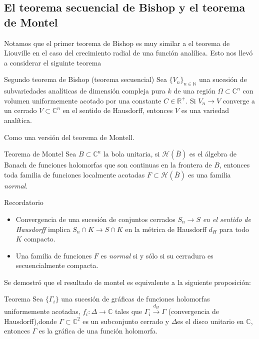 \documentclass[letterpaper]{beamer}
\newcommand{\nat}{\ensuremath{ \mathbb N }}
\newcommand{\co}{\ensuremath{\mathbb C }}
\newcommand{\con}{\ensuremath{\mathbb{C}^n}}
\newcommand{\re}{\ensuremath{\mathbb R }}
\begin{document}
\subsection{El teorema secuencial de Bishop y el teorema de Montel}

\begin{frame}
      Notamos que el primer teorema de Bishop es muy similar a el teorema de Liouville en el caso del crecimiento radial de una función analílica. Esto nos llevó a considerar el siguinte teorema
      \begin{block}{Segundo teorema de Bishop (teorema secuencial)}\label{Bishop2}
        Sea $\{ V_n \}_{n\in\nat}$ una sucesi\'on de subvariedades anal\'iticas de dimensi\'on compleja pura $k$ de una regi\'on
        $\Omega\subset\con$ con volumen uniformemente acotado por una constante $C\in\re^{+}$.
        Si $V_n\rightarrow V$ converge a un cerrado $V\subset\con$ en el sentido de Hausdorff, entonces $V$ es una
        variedad anal\'itica.
      \end{block}
      Como una versión del teorema de Montell.
\end{frame}

\begin{frame}
\begin{block}{Teorema de Montel}\label{Montel}
        Sea $B\subset\con$ la bola unitaria, si $\mathcal{H}(\overline{B})$ es el \'algebra de Banach de funciones holomorfas que son continuas
        en la frontera de $B$, entonces toda familia de funciones localmente acotadas $F\subset\mathcal{H}(\overline{B})$ es una familia \textit{normal}.
      \end{block}
      \begin{block}{Recordatorio}
        \begin{itemize}
          \item Convergencia de una sucesi\'on de conjuntos cerrados $S_n\rightarrow S$ \emph{en el sentido de Hausdorff} implica $S_n\cap K\rightarrow S\cap K$ en la m\'etrica de Hausdorff $d_H$ para todo $K$ compacto.
          \item Una familia de funciones $F$ es \textit{normal} si y s\'olo si su cerradura es secuencialmente compacta.
        \end{itemize}
    \end{block}
\end{frame}
\begin{frame}
  Se demostró que el resultado de montel es equivalente a la siguiente proposici\'on:
\begin{block}{Teorema}
  Sea $\lbrace\Gamma_i\rbrace$ una sucesi\'on de gr\'aficas de funciones holomorfas uniformemente acotadas, $f_i:\Delta\rightarrow\co$ tales que
  $\Gamma_i\overset{d_H}\longrightarrow\Gamma$ (convergencia de Hausdorff),donde $\Gamma\subset\co^2$ es un subconjunto cerrado y $\Delta$es el disco unitario
    en $\co$, entonces $\Gamma$ es la gr\'afica de una funci\'on holomorfa.
\end{block}
\end{frame}
\end{document}
